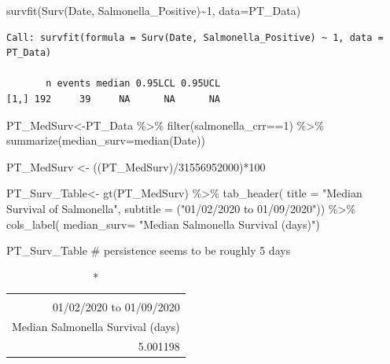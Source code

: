 \documentclass[
  letterpaper,
  DIV=11,
  numbers=noendperiod]{scrartcl}
\newenvironment{Shaded}{}{}
\newcommand{\AttributeTok}[1]{\textcolor[rgb]{0.84,0.23,0.29}{#1}}
\newcommand{\CommentTok}[1]{\textcolor[rgb]{0.42,0.45,0.49}{#1}}
\newcommand{\DecValTok}[1]{\textcolor[rgb]{0.00,0.36,0.77}{#1}}
\newcommand{\FunctionTok}[1]{\textcolor[rgb]{0.44,0.26,0.76}{#1}}
\newcommand{\NormalTok}[1]{\textcolor[rgb]{0.14,0.16,0.18}{#1}}
\newcommand{\OtherTok}[1]{\textcolor[rgb]{0.44,0.26,0.76}{#1}}
\newcommand{\SpecialCharTok}[1]{\textcolor[rgb]{0.00,0.36,0.77}{#1}}
\newcommand{\StringTok}[1]{\textcolor[rgb]{0.01,0.18,0.38}{#1}}
\begin{document}
\begin{Shaded}
\begin{Highlighting}[]
\FunctionTok{survfit}\NormalTok{(}\FunctionTok{Surv}\NormalTok{(Date, Salmonella\_Positive)}\SpecialCharTok{\textasciitilde{}}\DecValTok{1}\NormalTok{, }\AttributeTok{data=}\NormalTok{PT\_Data)}
\end{Highlighting}
\end{Shaded}

\begin{verbatim}
Call: survfit(formula = Surv(Date, Salmonella_Positive) ~ 1, data = PT_Data)

       n events median 0.95LCL 0.95UCL
[1,] 192     39     NA      NA      NA
\end{verbatim}

\begin{Shaded}
\begin{Highlighting}[]
\NormalTok{PT\_MedSurv}\OtherTok{\textless{}{-}}\NormalTok{PT\_Data }\SpecialCharTok{\%\textgreater{}\%}
 \FunctionTok{filter}\NormalTok{(salmonella\_crr}\SpecialCharTok{==}\DecValTok{1}\NormalTok{) }\SpecialCharTok{\%\textgreater{}\%}
  \FunctionTok{summarize}\NormalTok{(}\AttributeTok{median\_surv=}\FunctionTok{median}\NormalTok{(Date))}

\NormalTok{PT\_MedSurv }\OtherTok{\textless{}{-}}\NormalTok{ ((PT\_MedSurv)}\SpecialCharTok{/}\DecValTok{31556952000}\NormalTok{)}\SpecialCharTok{*}\DecValTok{100}

\NormalTok{PT\_Surv\_Table}\OtherTok{\textless{}{-}} \FunctionTok{gt}\NormalTok{(PT\_MedSurv) }\SpecialCharTok{\%\textgreater{}\%}
   \FunctionTok{tab\_header}\NormalTok{(}
    \AttributeTok{title =} \StringTok{"Median Survival of Salmonella"}\NormalTok{,}
    \AttributeTok{subtitle =}\NormalTok{ (}\StringTok{"01/02/2020 to 01/09/2020"}\NormalTok{)) }\SpecialCharTok{\%\textgreater{}\%}
  \FunctionTok{cols\_label}\NormalTok{(}
    \AttributeTok{median\_surv=} \StringTok{"Median Salmonella Survival (days)"}\NormalTok{) }

\NormalTok{PT\_Surv\_Table }\CommentTok{\# persistence seems to be roughly 5 days}
\end{Highlighting}
\end{Shaded}

\begin{longtable}{r}
\caption*{
{\large Median Survival of Salmonella} \\ 
{\small 01/02/2020 to 01/09/2020}
} \\ 
\toprule
Median Salmonella Survival (days) \\ 
\midrule
5.001198 \\ 
\bottomrule
\end{longtable}
\end{document}
